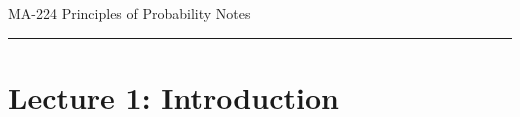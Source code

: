 ﻿\documentclass[12pt]{article}
\begin{document}
\begin{center}
{\LARGE MA-224 Principles of Probability Notes\par}
\end{center}
\hrule
\vspace{1.5em}

\section*{Lecture 1: Introduction}
\end{document}
